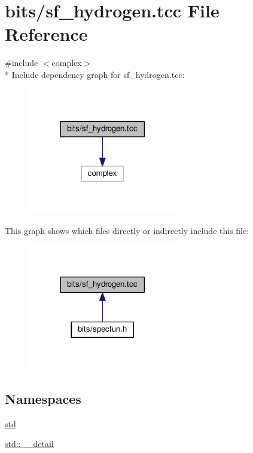 \hypertarget{sf__hydrogen_8tcc}{}\section{bits/sf\+\_\+hydrogen.tcc File Reference}
\label{sf__hydrogen_8tcc}
{\ttfamily \#include $<$complex$>$}\\*
Include dependency graph for sf\+\_\+hydrogen.\+tcc\+:
\nopagebreak
\begin{figure}[H]
\begin{center}
\leavevmode
\includegraphics[width=185pt]{sf__hydrogen_8tcc__incl}
\end{center}
\end{figure}
This graph shows which files directly or indirectly include this file\+:
\nopagebreak
\begin{figure}[H]
\begin{center}
\leavevmode
\includegraphics[width=185pt]{sf__hydrogen_8tcc__dep__incl}
\end{center}
\end{figure}
\subsection*{Namespaces}
\begin{DoxyCompactItemize}
\item 
 \hyperlink{namespacestd}{std}
\item 
 \hyperlink{namespacestd_1_1____detail}{std\+::\+\_\+\+\_\+detail}
\end{DoxyCompactItemize}
